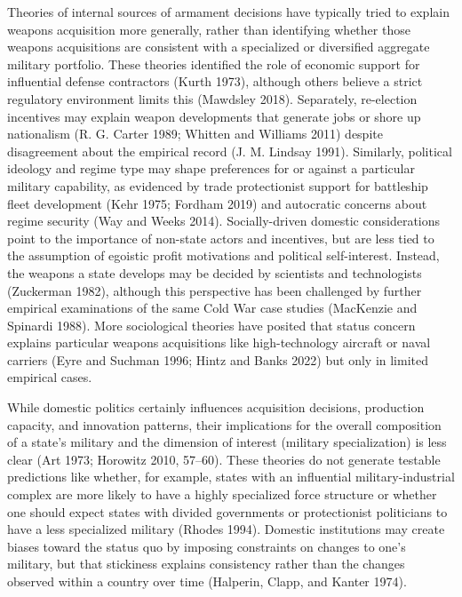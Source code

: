 \documentclass[
  12,
  letterpaper,
  DIV=11,
  numbers=noendperiod]{scrartcl}
\begin{document}
Theories of internal sources of armament decisions have typically tried
to explain weapons acquisition more generally, rather than identifying
whether those weapons acquisitions are consistent with a specialized or
diversified aggregate military portfolio. These theories identified the
role of economic support for influential defense contractors (Kurth
1973), although others believe a strict regulatory environment limits
this (Mawdsley 2018). Separately, re-election incentives may explain
weapon developments that generate jobs or shore up nationalism (R. G.
Carter 1989; Whitten and Williams 2011) despite disagreement about the
empirical record (J. M. Lindsay 1991). Similarly, political ideology and
regime type may shape preferences for or against a particular military
capability, as evidenced by trade protectionist support for battleship
fleet development (Kehr 1975; Fordham 2019) and autocratic concerns
about regime security (Way and Weeks 2014). Socially-driven domestic
considerations point to the importance of non-state actors and
incentives, but are less tied to the assumption of egoistic profit
motivations and political self-interest. Instead, the weapons a state
develops may be decided by scientists and technologists (Zuckerman
1982), although this perspective has been challenged by further
empirical examinations of the same Cold War case studies (MacKenzie and
Spinardi 1988). More sociological theories have posited that status
concern explains particular weapons acquisitions like high-technology
aircraft or naval carriers (Eyre and Suchman 1996; Hintz and Banks 2022)
but only in limited empirical cases.

While domestic politics certainly influences acquisition decisions,
production capacity, and innovation patterns, their implications for the
overall composition of a state's military and the dimension of interest
(military specialization) is less clear (Art 1973; Horowitz 2010,
57--60). These theories do not generate testable predictions like
whether, for example, states with an influential military-industrial
complex are more likely to have a highly specialized force structure or
whether one should expect states with divided governments or
protectionist politicians to have a less specialized military (Rhodes
1994). Domestic institutions may create biases toward the status quo by
imposing constraints on changes to one's military, but that stickiness
explains consistency rather than the changes observed within a country
over time (Halperin, Clapp, and Kanter 1974).
\end{document}
